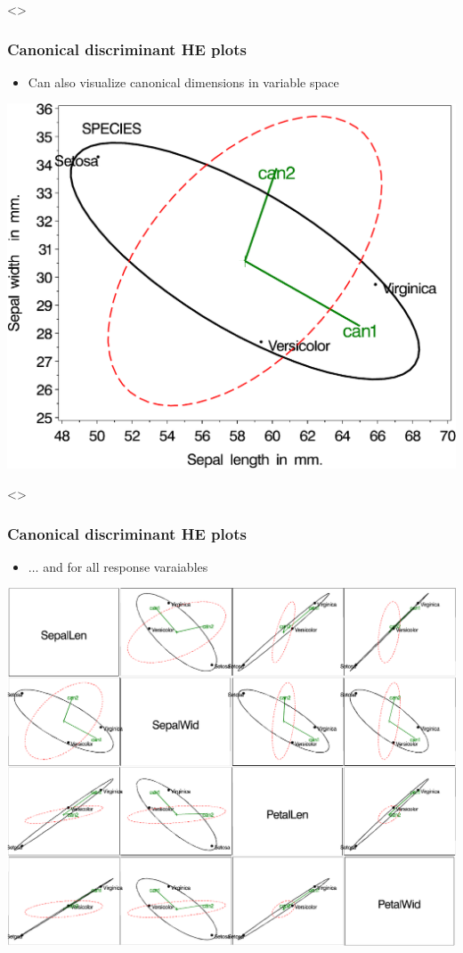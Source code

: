 \begin{frame}<\inlong>
  \frametitle{Canonical discriminant HE plots}
	\begin{itemize}
		\item Can also visualize canonical dimensions in variable space
	\end{itemize}
    \begin{center}
  \includegraphics[width=.7\textwidth,clip]{fig/hematiris-can2}
    \end{center}
\end{frame}
\begin{frame}<\inlong>
  \frametitle{Canonical discriminant HE plots}
	\begin{itemize}
		\item $\dots$ and for all response varaiables
	\end{itemize}
    \begin{center}
  \includegraphics[width=.7\textwidth,clip]{fig/hematiris-can1}
    \end{center}
\end{frame}

